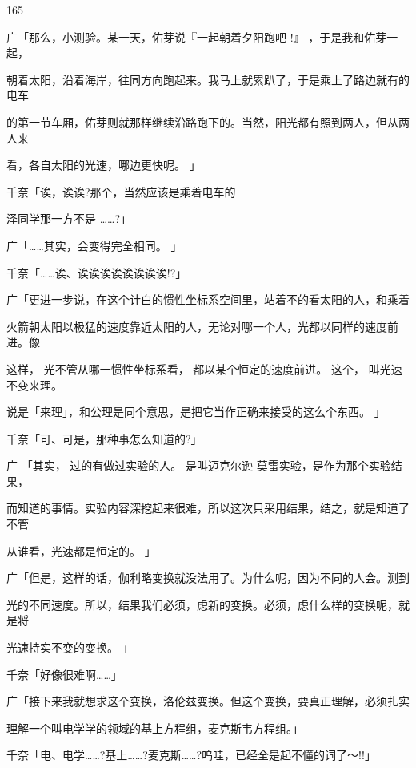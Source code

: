 165\par
广「那么，小测验。某一天，佑芽说『一起朝着夕阳跑吧 !』 ，于是我和佑芽一起，\par
朝着太阳，沿着海岸，往同方向跑起来。我马上就累趴了，于是乘上了路边就有的电车\par
的第一节车厢，佑芽则就那样继续沿路跑下的。当然，阳光都有照到两人，但从两人来\par
看，各自太阳的光速，哪边更快呢。 」\par
千奈「诶，诶诶?那个，当然应该是乘着电车的\par
泽同学那一方不是 ……?」\par
广「……其实，会变得完全相同。 」\par
千奈「……诶、诶诶诶诶诶诶诶诶!?」\par
广「更进一步说，在这个计白的惯性坐标系空间里，站着不的看太阳的人，和乘着\par
火箭朝太阳以极猛的速度靠近太阳的人，无论对哪一个人，光都以同样的速度前进。像\par
这样， 光不管从哪一惯性坐标系看， 都以某个恒定的速度前进。 这个， 叫光速不变来理。\par
说是「来理」，和公理是同个意思，是把它当作正确来接受的这么个东西。 」\par
千奈「可、可是，那种事怎么知道的?」\par
广 「其实， 过的有做过实验的人。 是叫迈克尔逊-莫雷实验，是作为那个实验结果，\par
而知道的事情。实验内容深挖起来很难，所以这次只采用结果，结之，就是知道了不管\par
从谁看，光速都是恒定的。 」\par
广「但是，这样的话，伽利略变换就没法用了。为什么呢，因为不同的人会。测到\par
光的不同速度。所以，结果我们必须，虑新的变换。必须，虑什么样的变换呢，就是将\par
光速持实不变的变换。 」\par
千奈「好像很难啊……」\par
广「接下来我就想求这个变换，洛伦兹变换。但这个变换，要真正理解，必须扎实\par
理解一个叫电学学的领域的基上方程组，麦克斯韦方程组。」\par
千奈「电、电学……?基上……?麦克斯……?呜哇，已经全是起不懂的词了～!!」\par

